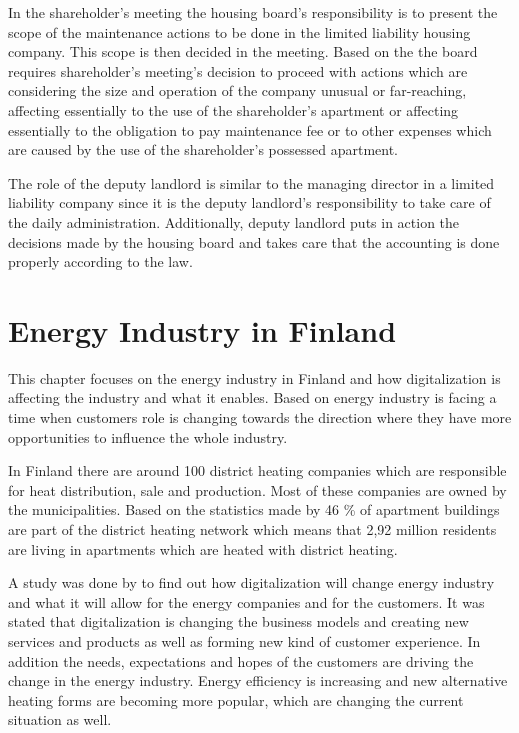 In the shareholder's meeting the housing board's responsibility is to present the scope of the maintenance actions to be done in the limited liability housing company. This scope is then decided in the meeting. \parencite{RantanenViiala:2015} Based on the \textcite{LLHA:2} the board requires shareholder's meeting's decision to proceed with actions which are considering the size and operation of the company unusual or far-reaching, affecting essentially to the use of the shareholder's apartment or affecting essentially to the obligation to pay maintenance fee or to other expenses which are caused by the use of the shareholder's possessed apartment.

The role of the deputy landlord is similar to the managing director in a limited liability company since it is the deputy landlord's responsibility to take care of the daily administration.  Additionally, deputy landlord puts in action the decisions made by the housing board and takes care that the accounting is done properly according to the law. \parencite{Sarekoski:2015}

\section{Energy Industry in Finland}

This chapter focuses on the energy industry in Finland and how digitalization is affecting the industry and what it enables. Based on \textcite{Energiateollisuus:2018} energy industry is facing a time when customers role is changing towards the direction where they have more opportunities to influence the whole industry.

In Finland there are around 100 district heating companies which are responsible for heat distribution, sale and production. Most of these companies are owned by the municipalities. \parencite{Energyindustry:2019,Poyry:2018} Based on the statistics made by \textcite{Energyindustrygraphs:2018} 46 \% of apartment buildings are part of the district heating network which means that 2,92 million residents are living in apartments which are heated with district heating.

A study was done by \textcite{Deloitte} to find out how digitalization will change energy industry and what it will allow for the energy companies and for the customers. It was stated that digitalization is changing the business models and creating new services and products as well as forming new kind of customer experience. In addition the needs, expectations and hopes of the customers are driving the change in the energy industry. Energy efficiency is increasing and new alternative heating forms are becoming more popular, which are changing the current situation as well. \parencite{Energiateollisuus:2018}

